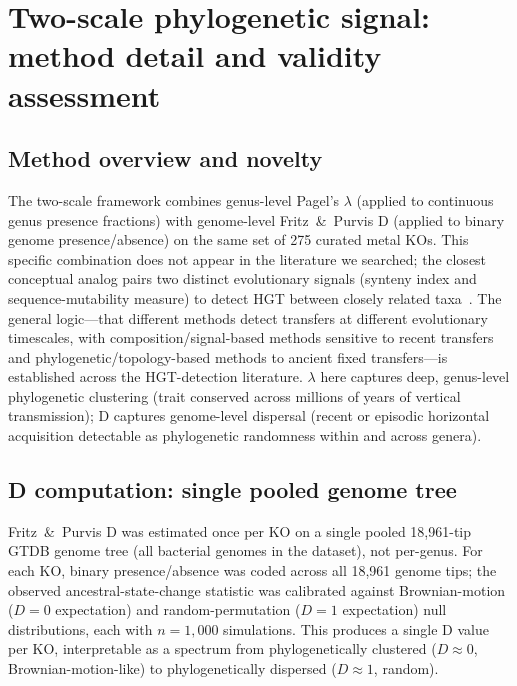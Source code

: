 \documentclass[11pt]{article}
\begin{document}
\clearpage
\section{Two-scale phylogenetic signal: method detail and validity assessment}
\label{sm:twoscale}

\subsection{Method overview and novelty}

The two-scale framework combines genus-level Pagel's $\lambda$ (applied to continuous genus presence fractions) with genome-level Fritz~\&~Purvis D (applied to binary genome presence/absence) on the same set of 275 curated metal KOs.
This specific combination does not appear in the literature we searched; the closest conceptual analog pairs two distinct evolutionary signals (synteny index and sequence-mutability measure) to detect HGT between closely related taxa~\cite{adato2015}.
The general logic---that different methods detect transfers at different evolutionary timescales, with composition/signal-based methods sensitive to recent transfers and phylogenetic/topology-based methods to ancient fixed transfers---is established across the HGT-detection literature.
$\lambda$ here captures deep, genus-level phylogenetic clustering (trait conserved across millions of years of vertical transmission); D captures genome-level dispersal (recent or episodic horizontal acquisition detectable as phylogenetic randomness within and across genera).

\subsection{D computation: single pooled genome tree}

Fritz~\&~Purvis D was estimated once per KO on a single pooled 18,961-tip GTDB genome tree (all bacterial genomes in the dataset), not per-genus.
For each KO, binary presence/absence was coded across all 18,961 genome tips; the observed ancestral-state-change statistic was calibrated against Brownian-motion ($D = 0$ expectation) and random-permutation ($D = 1$ expectation) null distributions, each with $n = 1{,}000$ simulations.
This produces a single D value per KO, interpretable as a spectrum from phylogenetically clustered ($D \approx 0$, Brownian-motion-like) to phylogenetically dispersed ($D \approx 1$, random).
\end{document}
